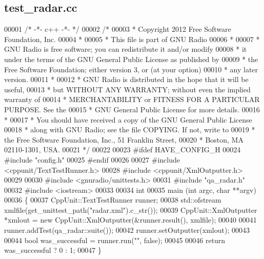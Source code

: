 \subsection{test\+\_\+radar.\+cc}
\label{test__radar_8cc_source}

\begin{DoxyCode}
00001 \textcolor{comment}{/* -*- c++ -*- */}
00002 \textcolor{comment}{/*}
00003 \textcolor{comment}{ * Copyright 2012 Free Software Foundation, Inc.}
00004 \textcolor{comment}{ *}
00005 \textcolor{comment}{ * This file is part of GNU Radio}
00006 \textcolor{comment}{ *}
00007 \textcolor{comment}{ * GNU Radio is free software; you can redistribute it and/or modify}
00008 \textcolor{comment}{ * it under the terms of the GNU General Public License as published by}
00009 \textcolor{comment}{ * the Free Software Foundation; either version 3, or (at your option)}
00010 \textcolor{comment}{ * any later version.}
00011 \textcolor{comment}{ *}
00012 \textcolor{comment}{ * GNU Radio is distributed in the hope that it will be useful,}
00013 \textcolor{comment}{ * but WITHOUT ANY WARRANTY; without even the implied warranty of}
00014 \textcolor{comment}{ * MERCHANTABILITY or FITNESS FOR A PARTICULAR PURPOSE.  See the}
00015 \textcolor{comment}{ * GNU General Public License for more details.}
00016 \textcolor{comment}{ *}
00017 \textcolor{comment}{ * You should have received a copy of the GNU General Public License}
00018 \textcolor{comment}{ * along with GNU Radio; see the file COPYING.  If not, write to}
00019 \textcolor{comment}{ * the Free Software Foundation, Inc., 51 Franklin Street,}
00020 \textcolor{comment}{ * Boston, MA 02110-1301, USA.}
00021 \textcolor{comment}{ */}
00022 
00023 \textcolor{preprocessor}{#ifdef HAVE\_CONFIG\_H}
00024 \textcolor{preprocessor}{#include "config.h"}
00025 \textcolor{preprocessor}{#endif}
00026 
00027 \textcolor{preprocessor}{#include <cppunit/TextTestRunner.h>}
00028 \textcolor{preprocessor}{#include <cppunit/XmlOutputter.h>}
00029 
00030 \textcolor{preprocessor}{#include <gnuradio/unittests.h>}
00031 \textcolor{preprocessor}{#include "qa_radar.h"}
00032 \textcolor{preprocessor}{#include <iostream>}
00033 
00034 \textcolor{keywordtype}{int}
00035 main (\textcolor{keywordtype}{int} argc, \textcolor{keywordtype}{char} **argv)
00036 \{
00037   CppUnit::TextTestRunner runner;
00038   std::ofstream xmlfile(get\_unittest\_path(\textcolor{stringliteral}{"radar.xml"}).c\_str());
00039   CppUnit::XmlOutputter *xmlout = \textcolor{keyword}{new} CppUnit::XmlOutputter(&runner.result(), xmlfile);
00040 
00041   runner.addTest(qa_radar::suite());
00042   runner.setOutputter(xmlout);
00043 
00044   \textcolor{keywordtype}{bool} was\_successful = runner.run(\textcolor{stringliteral}{""}, \textcolor{keyword}{false});
00045 
00046   \textcolor{keywordflow}{return} was\_successful ? 0 : 1;
00047 \}
\end{DoxyCode}
